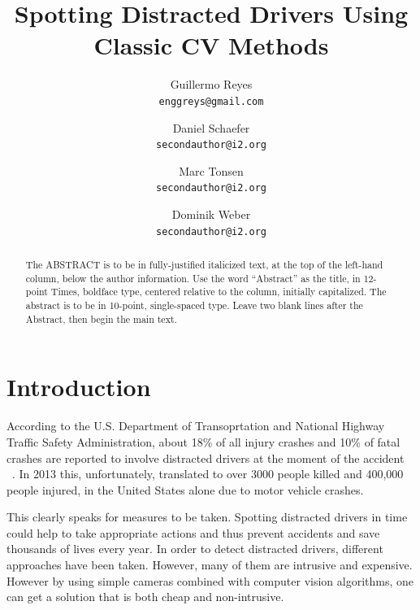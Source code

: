 \documentclass[10pt,twocolumn,letterpaper]{article}
\begin{document}
\title{Spotting Distracted Drivers Using Classic CV Methods}

\author{Guillermo Reyes\\
{\tt\small enggreys@gmail.com}
\and
Daniel Schaefer\\
{\tt\small secondauthor@i2.org}
\and
Marc Tonsen\\
{\tt\small secondauthor@i2.org}
\and
Dominik Weber\\
{\tt\small secondauthor@i2.org}
}

\maketitle

\begin{abstract}
   The ABSTRACT is to be in fully-justified italicized text, at the top
   of the left-hand column, below the author 
   information. Use the word ``Abstract'' as the title, in 12-point
   Times, boldface type, centered relative to the column, initially
   capitalized. The abstract is to be in 10-point, single-spaced type.
   Leave two blank lines after the Abstract, then begin the main text.
\end{abstract}


\section{Introduction}


According to the U.S. Department of Transoprtation and National Highway Traffic Safety Administration, about 18\% of all injury crashes and 10\% of fatal crashes are reported to involve distracted drivers at the moment of the accident ~\cite{knuthwebsite}. In 2013 this, unfortunately, translated to over 3000 people killed and 400,000 people injured, in the United States alone due to motor vehicle crashes.

This clearly speaks for measures to be taken. Spotting distracted drivers in time could help to take appropriate actions and thus prevent accidents and save thousands of lives every year. In order to detect distracted drivers, different approaches have been taken. However, many of them are intrusive and expensive. However by using simple cameras combined with computer vision algorithms, one can get a solution that is both cheap and non-intrusive.\\
\end{document}
